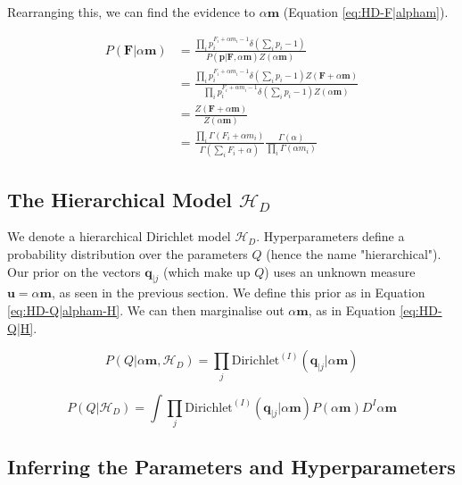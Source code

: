 \noindent Rearranging this, we can find the evidence to $\alpha\boldsymbol{m}$ (Equation \ref{eq:HD-F|alpham}).

\begin{align}
P(\boldsymbol{F}|\alpha\boldsymbol{m})&=\frac{\prod_{i}p_{i}^{F_{i}+\alpha m_{i}-1}\delta(\sum_{i}p_{i}-1)}{P(\boldsymbol{p}|\boldsymbol{F},\alpha\boldsymbol{m})Z(\alpha\boldsymbol{m})} \nonumber
\\
&=\frac{\prod_{i}p_{i}^{F_{i}+\alpha m_{i}-1}\delta(\sum_{i}p_{i}-1)Z(\boldsymbol{F}+\alpha\boldsymbol{m})}{\prod_{i}p_{i}^{F_{i}+\alpha m_{i}-1}\delta(\sum_{i}p_{i}-1)Z(\alpha\boldsymbol{m})} \nonumber
\\
&=\frac{Z(\boldsymbol{F}+\alpha\boldsymbol{m})}{Z(\alpha\boldsymbol{m})} \nonumber
\\
&=\frac{\prod_{i}\Gamma(F_{i}+\alpha m_{i})}{\Gamma(\sum_{i}F_{i}+\alpha)}\frac{\Gamma(\alpha)}{\prod_{i}\Gamma(\alpha m_{i})}
\label{eq:HD-F|alpham}
\end{align}

\subsection{The Hierarchical Model $\mathscr{H}_{D}$}

We denote a hierarchical Dirichlet model $\mathscr{H}_{D}$. Hyperparameters define a probability distribution over the parameters $Q$ (hence the name "hierarchical"). Our prior on the vectors $\boldsymbol{q}_{|j}$ (which make up $Q$) uses an unknown measure $\boldsymbol{u}=\alpha\boldsymbol{m}$, as seen in the previous section. We define this prior as in Equation \ref{eq:HD-Q|alpham-H}. We can then marginalise out $\alpha\boldsymbol{m}$, as in Equation \ref{eq:HD-Q|H}.

\begin{equation}
P(Q|\alpha\boldsymbol{m},\mathscr{H}_{D})=\prod_{j}\text{Dirichlet}^{(I)}(\boldsymbol{q}_{|j}|\alpha\boldsymbol{m})
\label{eq:HD-Q|alpham-H}
\end{equation}

\begin{equation}
P(Q|\mathscr{H}_{D})=\int\prod_{j}\text{Dirichlet}^{(I)}(\boldsymbol{q}_{|j}|\alpha\boldsymbol{m})P(\alpha\boldsymbol{m})D^{I}\alpha\boldsymbol{m}
\label{eq:HD-Q|H}
\end{equation}

\subsection{Inferring the Parameters and Hyperparameters}

